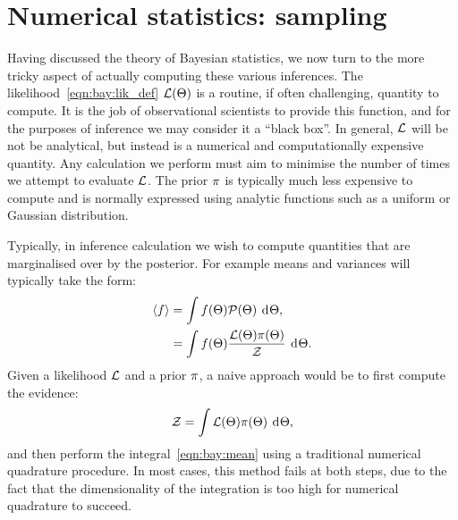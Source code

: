 \section{Numerical statistics: sampling}
\label{sec:bay:samp}
Having discussed the theory of Bayesian statistics, we now turn to the more tricky aspect of actually computing these various inferences. The likelihood~\eqref{eqn:bay:lik_def} $\mathcal{L}(\Theta)$ is a routine, if often challenging, quantity to compute. It is the job of observational scientists to provide this function, and for the purposes of inference we may consider it a ``black box''. In general, $\mathcal{L}$ will be not be analytical, but instead is a numerical and computationally expensive quantity. Any calculation we perform must aim to minimise the number of times we attempt to evaluate $\mathcal{L}$. The prior $\pi$ is typically much less expensive to compute and is normally expressed using analytic functions such as a uniform or Gaussian distribution.

Typically, in inference calculation we wish to compute quantities that are marginalised over by the posterior. For example means and variances will typically take the form:
\begin{align}
  {\left\langle{f}\right\rangle} 
  &= \int f(\Theta)\mathcal{P}(\Theta)\:\operatorname{d}^{}\!{\Theta},
  \label{eqn:bay:mean}\\
  &= \int f(\Theta)\frac{\mathcal{L}(\Theta)\pi(\Theta)}{\mathcal{Z}}\:\operatorname{d}^{}\!{\Theta}.
\end{align}
Given a likelihood $\mathcal{L}$ and a prior $\pi$, a naive approach would be to first compute the evidence:
\begin{equation}
  \mathcal{Z} = \int \mathcal{L}(\Theta) \pi(\Theta) \: \operatorname{d}^{}\!{\Theta},
  \label{eqn:bay:ev_short}
\end{equation}
and then perform the integral~\eqref{eqn:bay:mean} using a traditional numerical quadrature procedure. In most cases, this method fails at both steps, due to the fact that the dimensionality of the integration is too high for numerical quadrature to succeed.


